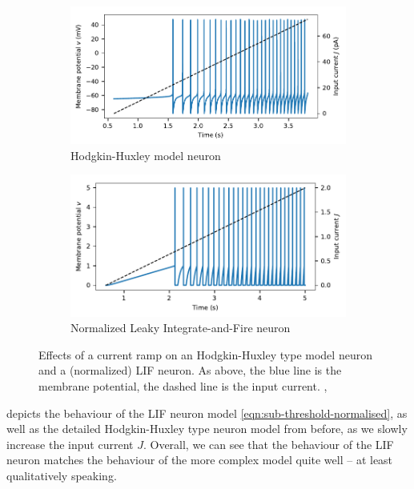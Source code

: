 \documentclass[10pt,letterpaper,oneside]{article}
\begin{document}
\begin{figure}[t]
	\begin{subfigure}{\textwidth}
		\centering
		\includegraphics{media/hh_neuron_ramp.pdf}
		\caption{Hodgkin-Huxley model neuron}
	\end{subfigure}
	\begin{subfigure}{\textwidth}
		\centering
		\includegraphics{media/lif_neuron_ramp.pdf}
		\caption{Normalized Leaky Integrate-and-Fire neuron}
	\end{subfigure}
	\caption{Effects of a current ramp on an Hodgkin-Huxley type model neuron and a (normalized) LIF neuron. As above, the blue line is the membrane potential, the dashed line is the input current. , }
	\label{fig:current_ramp}
\end{figure}

 depicts the behaviour of the LIF neuron model \cref{eqn:sub-threshold-normalised}, as well as the detailed Hodgkin-Huxley type neuron model from before, as we slowly increase the input current $J$. Overall, we can see that the behaviour of the LIF neuron matches the behaviour of the more complex model quite well -- at least qualitatively speaking.
\end{document}
